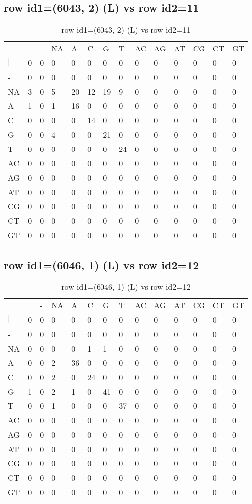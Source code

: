 \subsection{row id1=(6043, 2) (L) vs row id2=11}
\begin{center}
\begin{longtable}{|l|l|l|l|l|l|l|l|l|l|l|l|l|l|}
\caption{row id1=(6043, 2) (L) vs row id2=11} \label{table_dm36}\\
\hline
\\
\hline
&$|$&-&NA&A&C&G&T&AC&AG&AT&CG&CT&GT\\
$|$&0&0&0&0&0&0&0&0&0&0&0&0&0\\
-&0&0&0&0&0&0&0&0&0&0&0&0&0\\
NA&3&0&5&20&12&19&9&0&0&0&0&0&0\\
A&1&0&1&16&0&0&0&0&0&0&0&0&0\\
C&0&0&0&0&14&0&0&0&0&0&0&0&0\\
G&0&0&4&0&0&21&0&0&0&0&0&0&0\\
T&0&0&0&0&0&0&24&0&0&0&0&0&0\\
AC&0&0&0&0&0&0&0&0&0&0&0&0&0\\
AG&0&0&0&0&0&0&0&0&0&0&0&0&0\\
AT&0&0&0&0&0&0&0&0&0&0&0&0&0\\
CG&0&0&0&0&0&0&0&0&0&0&0&0&0\\
CT&0&0&0&0&0&0&0&0&0&0&0&0&0\\
GT&0&0&0&0&0&0&0&0&0&0&0&0&0\\
\hline
\end{longtable}
\end{center}

\subsection{row id1=(6046, 1) (L) vs row id2=12}
\begin{center}
\begin{longtable}{|l|l|l|l|l|l|l|l|l|l|l|l|l|l|}
\caption{row id1=(6046, 1) (L) vs row id2=12} \label{table_dm38}\\
\hline
\\
\hline
&$|$&-&NA&A&C&G&T&AC&AG&AT&CG&CT&GT\\
$|$&0&0&0&0&0&0&0&0&0&0&0&0&0\\
-&0&0&0&0&0&0&0&0&0&0&0&0&0\\
NA&0&0&0&0&1&1&0&0&0&0&0&0&0\\
A&0&0&2&36&0&0&0&0&0&0&0&0&0\\
C&0&0&2&0&24&0&0&0&0&0&0&0&0\\
G&1&0&2&1&0&41&0&0&0&0&0&0&0\\
T&0&0&1&0&0&0&37&0&0&0&0&0&0\\
AC&0&0&0&0&0&0&0&0&0&0&0&0&0\\
AG&0&0&0&0&0&0&0&0&0&0&0&0&0\\
AT&0&0&0&0&0&0&0&0&0&0&0&0&0\\
CG&0&0&0&0&0&0&0&0&0&0&0&0&0\\
CT&0&0&0&0&0&0&0&0&0&0&0&0&0\\
GT&0&0&0&0&0&0&0&0&0&0&0&0&0\\
\hline
\end{longtable}
\end{center}

